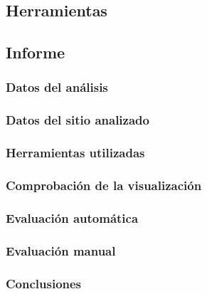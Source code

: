 \documentclass[a4paper,11pt]{article}
\begin{document}
\subsection{Herramientas}
\subsection{Informe}
\subsubsection{Datos del análisis}
\subsubsection{Datos del sitio analizado}
\subsubsection{Herramientas utilizadas}
\subsubsection{Comprobación de la visualización}
\subsubsection{Evaluación automática}
\subsubsection{Evaluación manual}
\subsubsection{Conclusiones}
\end{document}
